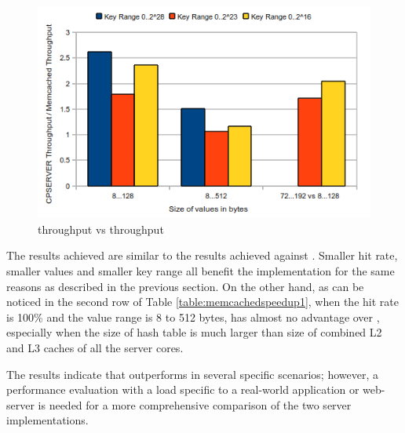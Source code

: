 \begin{figure}[!ht]
  \centering
  \includegraphics[width=\linewidth]{figs/cpserverspeedup2.png}
  \caption{\cpserver{} throughput vs \memcached{} throughput}
  \label{fig:cpserverspeedup2}
\end{figure}

The results achieved are similar to the results achieved against \lockserver{}. Smaller hit rate, smaller values and smaller key range all benefit the
\cpserver{} implementation for the same reasons as described in the previous section. On the other hand, as can be noticed in the second row of Table 
\ref{table:memcachedspeedup1}, when the hit rate is 100\% and the value range is 8 to 512 bytes, \cpserver{} has almost no advantage over \memcached{},
especially when the size of hash table is much larger than size of combined L2 and L3 caches of all the server cores.

The results indicate that \cpserver{} outperforms \memcached{} in several specific scenarios; however, a performance evaluation with a load specific to a 
real-world application or web-server is needed for a more comprehensive comparison of the two server implementations. 


